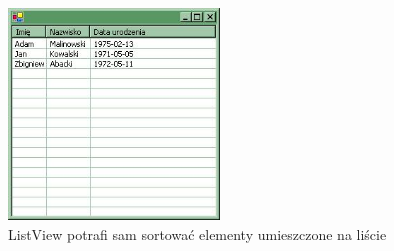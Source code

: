 \begin{figure}
\begin{center}
\includegraphics[width=0.50\textwidth]{./pic/swf03}
\caption{ListView potrafi sam sortować elementy umieszczone na liście}
\end{center}
\end{figure}

